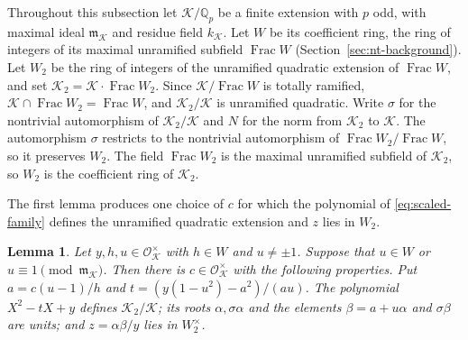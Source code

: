 \documentclass[11pt]{article}
\theoremstyle{plain}
\newtheorem{lemma}[theorem]{Lemma}
\theoremstyle{definition}
\theoremstyle{remark}
\DeclareMathOperator{\Frac}{Frac}
\newcommand{\Q}{\mathbb Q}
\newcommand{\OO}{\mathcal O}
\begin{document}
Throughout this subsection let $\mathcal K/\Q_p$ be a finite extension
with $p$ odd, with maximal ideal $\mathfrak m_{\mathcal K}$ and residue
field $k_{\mathcal K}$.  Let $W$ be its coefficient ring, the ring of
integers of its maximal unramified subfield $\Frac W$
(Section~\ref{sec:nt-background}).  Let $W_2$ be the ring of integers of
the unramified quadratic extension of $\Frac W$, and set
$\mathcal K_2=\mathcal K\cdot\Frac W_2$.  Since $\mathcal K/\Frac W$ is
totally ramified, $\mathcal K\cap\Frac W_2=\Frac W$, and
$\mathcal K_2/\mathcal K$ is unramified quadratic.  Write $\sigma$ for the
nontrivial automorphism of $\mathcal K_2/\mathcal K$ and $N$ for the norm
from $\mathcal K_2$ to $\mathcal K$.  The automorphism $\sigma$ restricts
to the nontrivial automorphism of $\Frac W_2/\Frac W$, so it preserves
$W_2$.  The field $\Frac W_2$ is the maximal unramified subfield of
$\mathcal K_2$, so $W_2$ is the coefficient ring of $\mathcal K_2$.

The first lemma produces one choice of $c$ for which the polynomial of
\eqref{eq:scaled-family} defines the unramified quadratic extension and
$z$ lies in $W_2$.

\begin{lemma}\label{lem:coefficient-model}
Let $y,h,u\in\OO_{\mathcal K}^\times$ with $h\in W$ and $u\ne\pm1$.
Suppose that $u\in W$ or $u\equiv1\pmod{\mathfrak m_{\mathcal K}}$.
Then there is $c\in\OO_{\mathcal K}^\times$ with the following
properties.  Put $a=c(u-1)/h$ and $t=(y(1-u^2)-a^2)/(au)$.  The
polynomial $X^2-tX+y$ defines $\mathcal K_2/\mathcal K$; its roots
$\alpha,\sigma\alpha$ and the elements $\beta=a+u\alpha$ and $\sigma\beta$
are units; and $z=\alpha\beta/y$ lies in $W_2^\times$.
\end{lemma}
\end{document}
